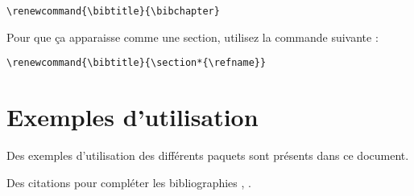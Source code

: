 \begin{framed}\vspace{-0.75em}
\begin{verbatim}\renewcommand{\bibtitle}{\bibchapter}
\end{verbatim}\vspace{-0.75em}
\end{framed}

Pour que ça apparaisse comme une section, utilisez la commande suivante :

\begin{framed}\vspace{-0.75em}
\begin{verbatim}\renewcommand{\bibtitle}{\section*{\refname}}
\end{verbatim}\vspace{-0.75em}
\end{framed}


\section{Exemples d'utilisation}

Des exemples d'utilisation des différents paquets sont présents dans ce document.


Des citations pour compléter les bibliographies , .
 

  
\renewcommand{\bibtitle}{\section*{\refname}}


